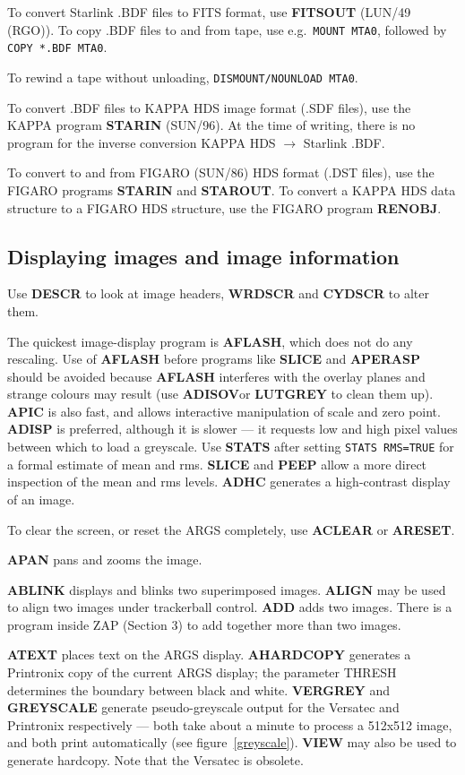 To convert Starlink .BDF files to FITS format, use {\bf FITSOUT}
(LUN/49 (RGO)).
To copy .BDF files to and from tape, use e.g.\ {\tt MOUNT MTA0}, followed by
{\tt COPY *.BDF MTA0}.

To rewind a tape without unloading, {\tt DISMOUNT/NOUNLOAD MTA0}.

To convert .BDF files to KAPPA HDS image format (.SDF files), use the KAPPA program {\bf STARIN} (SUN/96).
At the time of writing, there is no program for the inverse
conversion KAPPA HDS
$\rightarrow$
Starlink .BDF.

To convert to and from FIGARO (SUN/86) HDS format (.DST files),
use the FIGARO programs {\bf STARIN} and {\bf STAROUT}.
To convert a KAPPA HDS data structure to a
FIGARO HDS structure, use
the FIGARO program {\bf RENOBJ}.

\subsection {Displaying images and image information}

Use {\bf DESCR} to look at image headers, {\bf WRDSCR} and {\bf CYDSCR} to
alter them.

The quickest image-display program is {\bf AFLASH}, which does not do any
rescaling.
Use of {\bf AFLASH} before programs like {\bf SLICE} and {\bf APERASP} should be
avoided because {\bf AFLASH} interferes with the overlay planes and strange
colours may result (use {\bf ADISOV}or {\bf LUTGREY} to clean them up).
{\bf APIC} is also fast, and allows interactive manipulation of scale and zero
point.
{\bf ADISP} is preferred, although it is slower --- it requests low
and high pixel values between which to load a greyscale.
Use {\bf STATS} after setting {\tt STATS RMS=TRUE} for a formal estimate of
mean and rms.
{\bf SLICE} and {\bf PEEP} allow a more direct inspection of the mean and rms
levels.
{\bf ADHC} generates a high-contrast display of an image.

To clear the screen, or reset the ARGS completely, use {\bf ACLEAR} or
{\bf ARESET}.

{\bf APAN} pans and zooms the image.

{\bf ABLINK} displays and blinks two superimposed images.
{\bf ALIGN} may be used to align two images under trackerball control.
{\bf ADD} adds two images.
There is a program inside ZAP (Section 3) to add together more than two images.

{\bf ATEXT} places text on the ARGS display.
{\bf AHARDCOPY} generates a Printronix copy of the current ARGS display; the
parameter THRESH determines the boundary between black and white.
{\bf VERGREY} and {\bf GREYSCALE} generate pseudo-greyscale output for the
Versatec and Printronix respectively --- both take about a minute to process a
512x512 image, and both print automatically (see figure~\ref{greyscale}).
{\bf VIEW} may also be used to generate hardcopy.
Note that the Versatec is obsolete.

